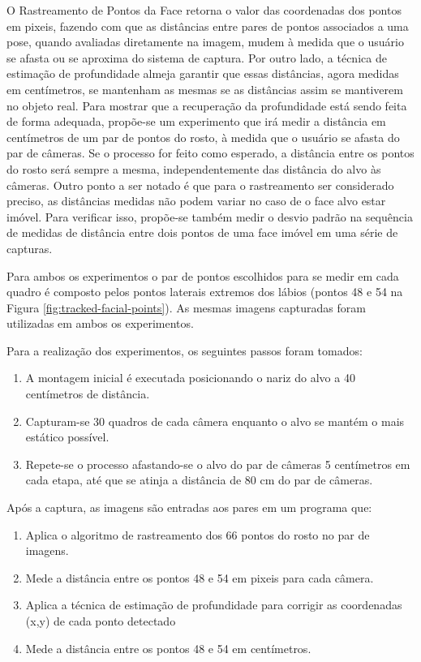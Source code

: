 O Rastreamento de Pontos da Face retorna o valor das coordenadas dos pontos em
pixeis, fazendo com que as distâncias entre pares de pontos associados a uma
pose, quando avaliadas diretamente na imagem, mudem à medida que o usuário se
afasta ou se aproxima do sistema de captura. Por outro lado, a técnica de
estimação de profundidade almeja garantir que essas distâncias, agora medidas em
centímetros, se mantenham as mesmas se as distâncias assim se mantiverem no
objeto real. Para mostrar que a recuperação da profundidade está sendo feita de
forma adequada, propõe-se um experimento que irá medir a distância em
centímetros de um par de pontos do rosto, à medida que o usuário se afasta do
par de câmeras. Se o processo for feito como esperado, a distância entre os
pontos do rosto será sempre a mesma, independentemente das distância do alvo às
câmeras.  Outro ponto a ser notado é que para o rastreamento ser considerado
preciso, as distâncias medidas não podem variar no caso de o face alvo estar
imóvel. Para verificar isso, propõe-se também medir o desvio padrão na sequência
de medidas de distância entre dois pontos de uma face imóvel em uma série de
capturas.


Para ambos os experimentos o par de pontos escolhidos para se medir em cada
quadro é composto pelos pontos laterais extremos dos lábios (pontos 48 e 54 na
Figura \ref{fig:tracked-facial-points}). As mesmas imagens capturadas foram
utilizadas em ambos os experimentos.

Para a realização dos experimentos, os seguintes passos foram tomados:

\begin{enumerate}
      
\item A montagem inicial é executada posicionando o nariz do alvo a 40
  centímetros de distância.

\item Capturam-se 30 quadros de cada câmera enquanto o alvo se mantém o mais
  estático possível.

\item Repete-se o processo afastando-se o alvo do par de câmeras 5 centímetros
  em cada etapa, até que se atinja a distância de 80 cm do par de câmeras.

\end{enumerate}

Após a captura, as imagens são entradas aos pares em um programa que:

\begin{enumerate}

\item Aplica o algoritmo de rastreamento dos 66 pontos do rosto no par de
  imagens.

\item Mede a distância entre os pontos 48 e 54 em pixeis para cada câmera.

\item Aplica a técnica de estimação de profundidade para corrigir as coordenadas
  (x,y) de cada ponto detectado

\item Mede a distância entre os pontos 48 e 54 em centímetros.

\end{enumerate}

